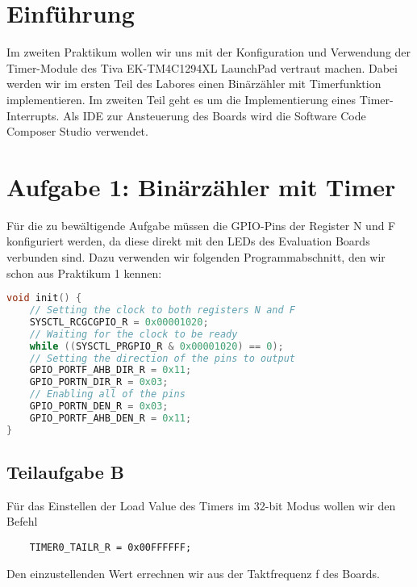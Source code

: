 \documentclass{article}
\begin{document}
\newpage


\tableofcontents

\listoffigures

\lstlistoflistings

\newpage

\section{Einführung}

Im zweiten Praktikum wollen wir uns mit der Konfiguration und Verwendung der Timer-Module des Tiva EK-TM4C1294XL LaunchPad vertraut machen. Dabei werden wir im ersten Teil des Labores einen Binärzähler mit Timerfunktion implementieren. Im zweiten Teil geht es um die Implementierung eines Timer-Interrupts. Als IDE zur Ansteuerung des Boards wird die Software Code Composer Studio verwendet.

\section{Aufgabe 1: Binärzähler mit Timer}

Für die zu bewältigende Aufgabe müssen die GPIO-Pins der Register N und F konfiguriert werden, da diese direkt mit den LEDs des Evaluation Boards verbunden sind. 
Dazu verwenden wir folgenden Programmabschnitt, den wir schon aus Praktikum 1 kennen:

\begin{lstlisting}[language=c, caption={GPIO-Port Konfiguration}, captionpos=b]
void init() {
    // Setting the clock to both registers N and F
    SYSCTL_RCGCGPIO_R = 0x00001020;
    // Waiting for the clock to be ready
    while ((SYSCTL_PRGPIO_R & 0x00001020) == 0);
    // Setting the direction of the pins to output
    GPIO_PORTF_AHB_DIR_R = 0x11;
    GPIO_PORTN_DIR_R = 0x03;
    // Enabling all of the pins
    GPIO_PORTN_DEN_R = 0x03;
    GPIO_PORTF_AHB_DEN_R = 0x11;
}
\end{lstlisting}

\subsection{Teilaufgabe B}
\label{eq:eins}
Für das Einstellen der Load Value des Timers im 32-bit Modus wollen wir den Befehl
\begin{verbatim}
    TIMER0_TAILR_R = 0x00FFFFFF;
\end{verbatim}

Den einzustellenden Wert errechnen wir aus der Taktfrequenz f des Boards.
\end{document}
